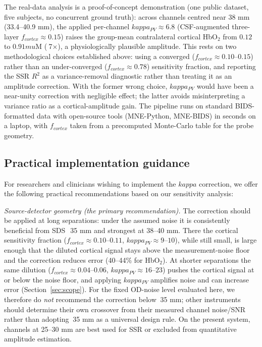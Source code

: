 \documentclass[11pt]{article}
\def\kappa{kappa}%
\def\mu{mu}%
\def\sim{~}%
\def\mathrm#1{#1}%
\def\,{ }%
\begin{document}
The real-data analysis is a proof-of-concept demonstration (one public dataset, five subjects, no concurrent ground truth): across channels centred near 38\,mm (33.4--40.9\,mm), the applied per-channel $\kappa_{\mathrm{PV}}\approx6.8$ (CSF-augmented three-layer $f_{\mathrm{cortex}}\approx0.15$) raises the group-mean contralateral cortical HbO$_2$ from $0.12$ to $0.91\,\mu$M ($\sim$7$\times$), a physiologically plausible amplitude. This rests on two methodological choices established above: using a converged ($f_{\mathrm{cortex}}\approx0.10$--$0.15$) rather than an under-converged ($f_{\mathrm{cortex}}\approx0.78$) sensitivity fraction, and reporting the SSR $R^2$ as a variance-removal diagnostic rather than treating it as an amplitude correction. With the former wrong choice, $\kappa_{\mathrm{PV}}$ would have been a near-unity correction with negligible effect; the latter avoids misinterpreting a variance ratio as a cortical-amplitude gain. The pipeline runs on standard BIDS-formatted data with open-source tools (MNE-Python, MNE-BIDS) in seconds on a laptop, with $f_{\mathrm{cortex}}$ taken from a precomputed Monte-Carlo table for the probe geometry.

\subsection{Practical implementation guidance}

For researchers and clinicians wishing to implement the $\kappa$ correction, we offer the following practical recommendations based on our sensitivity analysis:

\textit{Source-detector geometry (the primary recommendation).} The correction should be applied at long separations: under the assumed noise it is consistently beneficial from SDS~$\sim$35\,mm and strongest at 38--40\,mm. There the cortical sensitivity fraction ($f_{\mathrm{cortex}} \approx 0.10$--$0.11$, $\kappa_{\mathrm{PV}} \approx 9$--$10$), while still small, is large enough that the diluted cortical signal stays above the measurement-noise floor and the correction reduces error (40--44\% for HbO$_2$). At shorter separations the same dilution ($f_{\mathrm{cortex}} \approx 0.04$--$0.06$, $\kappa_{\mathrm{PV}} \approx 16$--$23$) pushes the cortical signal at or below the noise floor, and applying $\kappa_{\mathrm{PV}}$ amplifies noise and can increase error (Section~\ref{sec:scope}). For the fixed OD-noise level evaluated here, we therefore do \emph{not} recommend the correction below $\sim$35\,mm; other instruments should determine their own crossover from their measured channel noise/SNR rather than adopting $\sim$35\,mm as a universal design rule. On the present system, channels at 25--30\,mm are best used for SSR or excluded from quantitative amplitude estimation.
\end{document}
